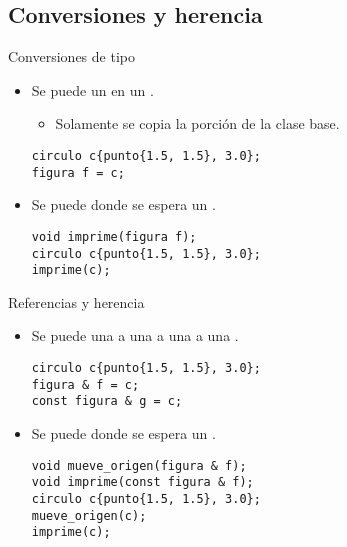 \subsection{Conversiones y herencia}

\begin{frame}[t,fragile]{Conversiones de tipo}
\begin{itemize}
  \item Se puede  
        un  en un .
    \begin{itemize}
      \item Solamente se copia la porción de la clase base.
    \end{itemize}
\begin{lstlisting}
circulo c{punto{1.5, 1.5}, 3.0};
figura f = c;
\end{lstlisting}

  \item Se puede  
         donde se espera un .
\begin{lstlisting}
void imprime(figura f);
circulo c{punto{1.5, 1.5}, 3.0};
imprime(c);
\end{lstlisting}

\end{itemize}
\end{frame}

\begin{frame}[t,fragile]{Referencias y herencia}
\begin{itemize}

  \item Se puede  
        una  a una 
        a una  a una .
\begin{lstlisting}
circulo c{punto{1.5, 1.5}, 3.0};
figura & f = c;
const figura & g = c;
\end{lstlisting}

  \item Se puede  
         donde se espera un .
\begin{lstlisting}
void mueve_origen(figura & f);
void imprime(const figura & f);
circulo c{punto{1.5, 1.5}, 3.0};
mueve_origen(c);
imprime(c);
\end{lstlisting}

\end{itemize}
\end{frame}

